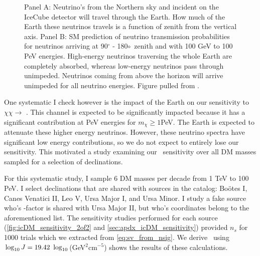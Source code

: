 \begin{figure}[t]
    \caption{Panel A: Neutrino's from the Northern sky and incident on the IceCube detector will travel through the Earth. How much of the Earth these neutrinos travels is a function of zenith from the vertical axis. Panel B: SM prediction of neutrino transmission probabilities for neutrinos arriving at 90$^\circ$ - 180$\circ$~zenith and with 100 GeV to 100 PeV energies. High-energy neutrinos traversing the whole Earth are completely absorbed, whereas low-energy neutrinos pass through unimpeded. Neutrinos coming from above the horizon will arrive unimpeded for all neutrino energies. Figure pulled from \cite{IC3:Earth_Attenuation}.}
    \label{fig:earth_attenuation}
\end{figure}

One systematic I check however is the impact of the Earth on our sensitivity to $\chi\chi \rightarrow$ \parpar{\nu_\mu}.
This channel is expected to be significantly impacted because it has a significant contribution at PeV energies for $m_\chi \ge 1$PeV.
The Earth is expected to attenuate these higher energy neutrinos.
However, these neutrino spectra have significant low energy contributions, so we do not expect to entirely lose our sensitivity.
This motivated a study examining our \sv~sensitivity over all DM masses sampled for a selection of declinations.

For this systematic study, I sample 6 DM masses per decade from 1 TeV to 100 PeV.
I select declinations that are shared with sources in the \GS catalog: Boötes I, Canes Venatici II, Leo V, Ursa Major I, and Ursa Minor.
I study a fake source who's \J-factor is shared with Ursa Major II, but who's coordinates belong to the aforementioned list.
The sensitivity studies performed for each source (\cref{fig:icDM_sensitivity_2of2} and \cref{sec:apdx_icDM_sensitivity}) provided $n_s$ for 1000 trials which we extracted from \cref{eq:sv_from_nsig}.
We derive \sv~using $\log_{10}J = 19.42~\log_{10}$(GeV$^2$cm$^{-5}$)
 shows the results of these calculations.

